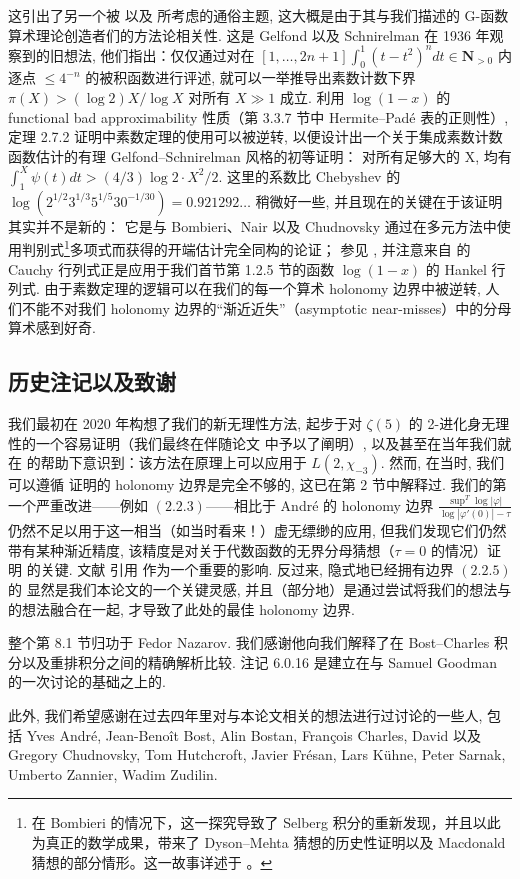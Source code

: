 这引出了另一个被 \cite[§ II]{Chu83a} 以及 \cite[第 493--494 页]{FW08} 所考虑的通俗主题, 
这大概是由于其与我们描述的 G-函数算术理论创造者们的方法论相关性. 
这是 Gelfond 以及 Schnirelman 在 1936 年观察到的旧想法, 
他们指出：仅仅通过对在 \([1,\ldots,2n+1]\int_0^1 (t-t^2)^n dt \in \mathbf{N}_{>0}\) 
内逐点 \(\leq 4^{-n}\) 的被积函数进行评述, 
就可以一举推导出素数计数下界 \(\pi(X) > (\log 2)X/\log X\) 对所有 \(X \gg 1\) 成立. 
利用 \(\log(1-x)\) 的 functional bad approximability 性质（第 3.3.7 节中 Hermite--Pad{\'e} 表的正则性）, 
定理 2.7.2 证明中素数定理的使用可以被逆转, 
以便设计出一个关于集成素数计数函数估计的有理 Gelfond--Schnirelman 风格的初等证明： 
对所有足够大的 X, 均有 \(\int_1^X \psi(t) dt > (4/3) \log 2 \cdot X^2/2\). 
这里的系数比 Chebyshev 的 \(\log \left(2^{1/2}3^{1/3}5^{1/5}30^{-1/30}\right) = 0.921292\ldots\) 
稍微好一些, 并且现在的关键在于该证明其实并不是新的： 
它是与 Bombieri、Nair 以及 Chudnovsky 
通过在多元方法中使用判别式\setcounter{footnote}{48}\footnote{在 Bombieri 的情况下，这一探究导致了 Selberg 积分的重新发现，并且以此为真正的数学成果，带来了 Dyson--Mehta 猜想的历史性证明以及 Macdonald 猜想的部分情形。这一故事详述于 \cite[第 1.2、1.3 节]{FW08}。}多项式而获得的开端估计完全同构的论证； 
参见 \cite[第 94 页]{Chu83a}, 
并注意来自 \cite[定理 1 证明]{Nai82} 的 Cauchy 行列式正是应用于我们首节第 1.2.5 节的函数 \(\log(1-x)\) 的 Hankel 行列式. 
由于素数定理的逻辑可以在我们的每一个算术 holonomy 边界中被逆转, 
人们不能不对我们 holonomy 边界的“渐近近失”（asymptotic near-misses）中的分母算术感到好奇.

\subsection{历史注记以及致谢}\label{sec:15.7}

我们最初在 2020 年构想了我们的新无理性方法, 
起步于对 \(\zeta(5)\) 的 2-进化身无理性的一个容易证明（我们最终在伴随论文 \cite{CDT24} 中予以了阐明）, 
以及甚至在当年我们就在 \cite{Zag09} 的帮助下意识到：该方法在原理上可以应用于 \(L(2,\chi_{-3})\). 
然而, 在当时, 我们可以遵循 \cite[§ VIII]{And89} 证明的 holonomy 边界是完全不够的, 
这已在第 2 节中解释过. 
我们的第一个严重改进——例如 \((2.2.3)\)——相比于 Andr{\'e} 的 holonomy 边界 \(\frac{\sup^T \log |\varphi|}{\log |\varphi'(0)| - \tau}\) 
仍然不足以用于这一相当（如当时看来！）虚无缥缈的应用, 
但我们发现它们仍然带有某种渐近精度, 
该精度是对关于代数函数的无界分母猜想（\(\tau=0\) 的情况）证明 \cite{CDT21} 的关键. 
文献 \cite{BC22} 引用 \cite{CDT21} 作为一个重要的影响. 
反过来, 隐式地已经拥有边界 \((2.2.5)\) 的 \cite{BC22} 显然是我们本论文的一个关键灵感, 
并且（部分地）是通过尝试将我们的想法与 \cite{BC22} 的想法融合在一起, 
才导致了此处的最佳 holonomy 边界.

整个第 8.1 节归功于 Fedor Nazarov. 
我们感谢他向我们解释了在 Bost--Charles 积分以及重排积分之间的精确解析比较. 
注记 6.0.16 是建立在与 Samuel Goodman 的一次讨论的基础之上的.

此外, 我们希望感谢在过去四年里对与本论文相关的想法进行过讨论的一些人, 
包括 Yves Andr{\'e}, Jean-Beno{\^i}t Bost, Alin Bostan, Fran{\c{c}}ois Charles, David 以及 Gregory Chudnovsky, Tom Hutchcroft, Javier Fr{\'e}san, Lars K{\"u}hne, Peter Sarnak, Umberto Zannier, Wadim Zudilin.